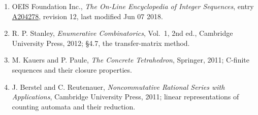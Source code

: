 \documentclass[11pt]{article}
\theoremstyle{definition}
\begin{document}
\begin{enumerate}

\item OEIS Foundation Inc., \emph{The On-Line Encyclopedia of Integer Sequences}, entry \href{https://oeis.org/A204278}{A204278}, revision 12, last modified Jun 07 2018.

\item R. P. Stanley, \emph{Enumerative Combinatorics}, Vol.~1, 2nd ed., Cambridge University Press, 2012; \S4.7, the transfer-matrix method.

\item M. Kauers and P. Paule, \emph{The Concrete Tetrahedron}, Springer, 2011; C-finite sequences and their closure properties.

\item J. Berstel and C. Reutenauer, \emph{Noncommutative Rational Series with Applications}, Cambridge University Press, 2011; linear representations of counting automata and their reduction.

\end{enumerate}
\end{document}
